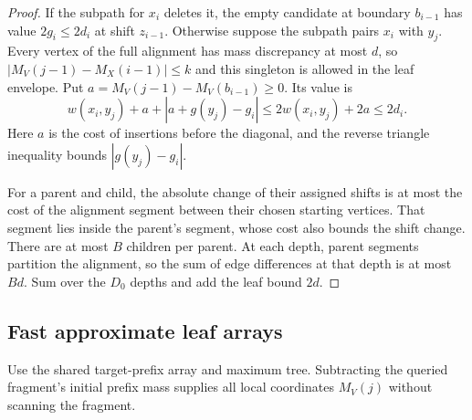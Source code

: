 \documentclass[11pt]{article}
\theoremstyle{definition}
\newcommand{\1}{\mathbf 1}
\begin{document}
\begin{proof}
If the subpath for $x_i$ deletes it, the empty candidate at boundary
$b_{i-1}$ has value $2g_i\le2d_i$ at shift $z_{i-1}$. Otherwise suppose
the subpath pairs $x_i$ with $y_j$. Every vertex of the full alignment
has mass discrepancy at most $d$, so
$|M_V(j-1)-M_X(i-1)|\le k$ and this singleton is allowed in
the leaf envelope. Put $a=M_V(j-1)-M_V(b_{i-1})\ge0$. Its value is
\[
 w(x_i,y_j)+a+|a+g(y_j)-g_i|
 \le 2w(x_i,y_j)+2a\le2d_i.
\]
Here $a$ is the cost of insertions before the diagonal, and the reverse
triangle inequality bounds $|g(y_j)-g_i|$.

For a parent and child, the absolute change of their assigned shifts is
at most the cost of the alignment segment between their chosen starting
vertices. That segment lies inside the parent's segment, whose cost
also bounds the shift change.
There are at most $B$ children per parent. At each depth, parent segments
partition the alignment, so the sum of edge differences at that depth is
at most $Bd$. Sum over the $D_0$ depths and add the leaf bound $2d$.
\end{proof}

\subsection{Fast approximate leaf arrays}

Use the shared target-prefix array and maximum tree. Subtracting the
queried fragment's initial prefix mass supplies all local coordinates
$M_V(j)$ without scanning the fragment.
\end{document}
